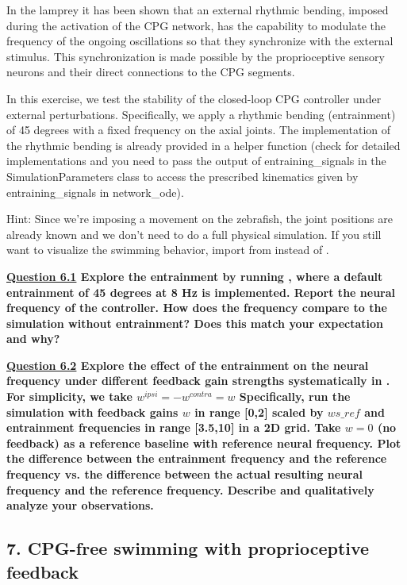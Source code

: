 \documentclass{cmc}
\begin{document}
In the lamprey it has been shown that an external rhythmic bending, imposed during the activation of the CPG network, has the capability to modulate the frequency of the ongoing oscillations so that they synchronize with the external stimulus. This synchronization is made possible by the proprioceptive sensory neurons and their direct connections to the CPG segments.

In this exercise, we test the stability of the closed-loop CPG controller under external perturbations. Specifically, we apply a rhythmic bending (entrainment) of 45 degrees with a fixed frequency on the axial joints. The implementation of the rhythmic bending is already provided in a helper function  (check  for detailed implementations and you need to pass the output of entraining\_signals in the SimulationParameters class to access the prescribed kinematics given by entraining\_signals in network\_ode).

Hint: Since we're imposing a movement on the zebrafish, the joint positions are already known and we don't need to do a full physical simulation.
If you still want to visualize the swimming behavior, import  from  instead of .

\textbf{\underline{Question 6.1} Explore the entrainment by running , where a default entrainment of 45 degrees at 8 Hz is implemented. Report the neural frequency of the controller. How does the frequency compare to the simulation without entrainment? Does this match your expectation and why?}

\textbf{\underline{Question 6.2} Explore the effect of the entrainment on the neural frequency under different feedback gain strengths systematically in . For simplicity, we take $w^{ipsi} = -w^{contra} = w$
Specifically, run the simulation with feedback gains $w$ in range [0,2] scaled by $ws\_ref$ and entrainment frequencies in range [3.5,10] in a 2D grid. Take $w=0$ (no feedback) as a reference baseline with reference neural frequency. Plot the difference between the entrainment frequency and the reference frequency vs. the difference between the actual resulting neural frequency and the reference frequency. Describe and qualitatively analyze your observations.}



\subsection*{7. CPG-free swimming with proprioceptive feedback}
\end{document}
